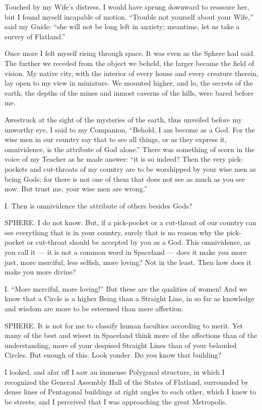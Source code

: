 \documentclass[12pt, a4paper, oneside]{memoir}
\begin{document}
Touched by my Wife's distress, I would have sprung downward to reassure her,
but I found myself incapable of motion. ``Trouble not yourself about your
Wife,'' said my Guide: ``she will not be long left in anxiety; meantime, let us
take a survey of Flatland.''

Once more I felt myself rising through space. It was even as the Sphere had
said. The further we receded from the object we beheld, the larger became the
field of vision. My native city, with the interior of every house and every
creature therein, lay open to my view in miniature. We mounted higher, and lo,
the secrets of the earth, the depths of the mines and inmost caverns of the
hills, were bared before me.

Awestruck at the sight of the mysteries of the earth, thus unveiled before my
unworthy eye, I said to my Companion, ``Behold, I am become as a God. For the
wise men in our country say that to see all things, or as they express it,
omnividence, is the attribute of God alone.'' There was something of scorn in
the voice of my Teacher as he made answer: ``it is so indeed? Then the very
pick-pockets and cut-throats of my country are to be worshipped by your wise
men as being Gods: for there is not one of them that does not see as much as
you see now. But trust me, your wise men are wrong.''

I. Then is omnividence the attribute of
others besides Gods?

SPHERE. I do not know. But, if a pick-pocket or a cut-throat of our country
can see everything that is in your country, surely that is no reason why the
pick-pocket or cut-throat should be accepted by you as a God. This
omnividence, as you call it --- it is not a common word in Spaceland --- does it
make you more just, more merciful, less selfish, more loving? Not in the
least. Then how does it make you more divine?

I. ``More merciful, more loving!'' But these are the qualities of women! And we
know that a Circle is a higher Being than a Straight Line, in so far as
knowledge and wisdom are more to be esteemed than mere affection.

SPHERE. It is not for me to classify human faculties according to merit. Yet
many of the best and wisest in Spaceland think more of the affections than of
the understanding, more of your despised Straight Lines than of your belauded
Circles. But enough of this. Look yonder. Do you know that building?

I looked, and afar off I saw an immense Polygonal structure, in which I
recognized the General Assembly Hall of the States of Flatland, surrounded by
dense lines of Pentagonal buildings at right angles to each other, which I
knew to be streets; and I perceived that I was approaching the great
Metropolis.
\end{document}
